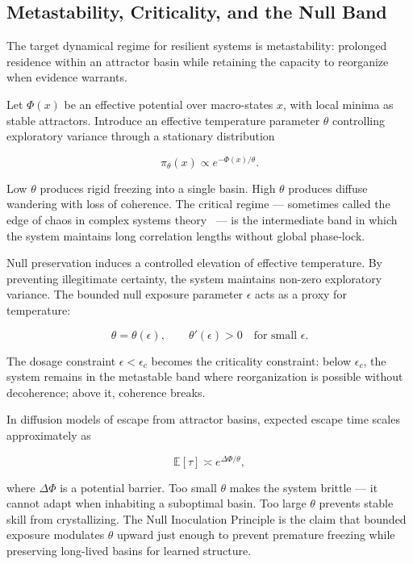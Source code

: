 \documentclass[11pt]{article}
\theoremstyle{remark}
\begin{document}
\subsection{Metastability, Criticality, and the Null Band}

The target dynamical regime for resilient systems is metastability: prolonged residence within an attractor basin while retaining the capacity to reorganize when evidence warrants.

Let $\Phi(x)$ be an effective potential over macro-states $x$, with local minima as stable attractors. Introduce an effective temperature parameter $\theta$ controlling exploratory variance through a stationary distribution

\[
\pi_\theta(x) \propto e^{-\Phi(x)/\theta}.
\]

Low $\theta$ produces rigid freezing into a single basin. High $\theta$ produces diffuse wandering with loss of coherence. The critical regime — sometimes called the edge of chaos in complex systems theory~\cite{langton} — is the intermediate band in which the system maintains long correlation lengths without global phase-lock.

Null preservation induces a controlled elevation of effective temperature. By preventing illegitimate certainty, the system maintains non-zero exploratory variance. The bounded null exposure parameter $\epsilon$ acts as a proxy for temperature:

\[
\theta = \theta(\epsilon), \qquad \theta'(\epsilon) > 0 \quad \text{for small } \epsilon.
\]

The dosage constraint $\epsilon < \epsilon_c$ becomes the criticality constraint: below $\epsilon_c$, the system remains in the metastable band where reorganization is possible without decoherence; above it, coherence breaks.

In diffusion models of escape from attractor basins, expected escape time scales approximately as

\begin{equation}
\mathbb{E}[\tau] \asymp e^{\Delta\Phi / \theta},
\label{eq:escape}
\end{equation}

where $\Delta\Phi$ is a potential barrier. Too small $\theta$ makes the system brittle — it cannot adapt when inhabiting a suboptimal basin. Too large $\theta$ prevents stable skill from crystallizing. The Null Inoculation Principle is the claim that bounded exposure modulates $\theta$ upward just enough to prevent premature freezing while preserving long-lived basins for learned structure.
\end{document}
